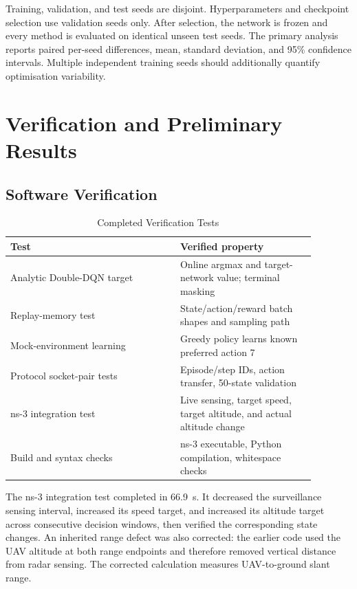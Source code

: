 \documentclass[10pt,conference]{IEEEtran}
\begin{document}
Training, validation, and test seeds are disjoint. Hyperparameters and
checkpoint selection use validation seeds only. After selection, the network
is frozen and every method is evaluated on identical unseen test seeds. The
primary analysis reports paired per-seed differences, mean, standard
deviation, and 95\% confidence intervals. Multiple independent training seeds
should additionally quantify optimisation variability.

\section{Verification and Preliminary Results}

\subsection{Software Verification}

\begin{table}[t]
\caption{Completed Verification Tests}
\label{tab:tests}
\centering
\scriptsize
\begin{tabular}{p{0.49\linewidth}p{0.39\linewidth}}
\toprule
Test & Verified property\\
\midrule
Analytic Double-DQN target & Online argmax and target-network value; terminal masking\\
Replay-memory test & State/action/reward batch shapes and sampling path\\
Mock-environment learning & Greedy policy learns known preferred action 7\\
Protocol socket-pair tests & Episode/step IDs, action transfer, 50-state validation\\
ns-3 integration test & Live sensing, target speed, target altitude, and actual altitude change\\
Build and syntax checks & ns-3 executable, Python compilation, whitespace checks\\
\bottomrule
\end{tabular}
\end{table}

The ns-3 integration test completed in 66.9~s. It decreased the surveillance
sensing interval, increased its speed target, and increased its altitude target
across consecutive decision windows, then verified the corresponding state
changes. An inherited range defect was also corrected: the earlier code used
the UAV altitude at both range endpoints and therefore removed vertical
distance from radar sensing. The corrected calculation measures UAV-to-ground
slant range.
\end{document}
